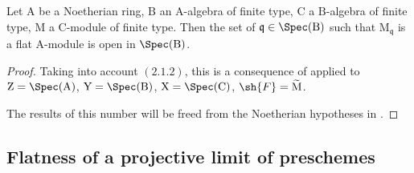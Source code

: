 \begin{corollary}[11.1.6]
\label{IV.11.1.6}
Let $\mathrm{A}$ be a Noetherian ring, $\mathrm{B}$ an $\mathrm{A}$-algebra of finite type, $\mathrm{C}$ a $\mathrm{B}$-algebra of finite type, $\mathrm{M}$ a $\mathrm{C}$-module of finite type. Then the set of $\mathfrak{q}\in\Spec(\mathrm{B})$ such that $\mathrm{M}_\mathfrak{q}$ is a flat $\mathrm{A}$-module is open in $\Spec(\mathrm{B})$.
\end{corollary}

\begin{proof}
Taking into account $(2.1.2)$, this is a consequence of  applied to $\mathrm{Z}=\Spec(\mathrm{A})$, $\mathrm{Y}=\Spec(\mathrm{B})$, $\mathrm{X}=\Spec(\mathrm{C})$, $\sh{F}=\widetilde{\mathrm{M}}$.

The results of this number will be freed from the Noetherian hypotheses in .
\end{proof}

\subsection{Flatness of a projective limit of preschemes}
\label{subsection:IV.11.2}


